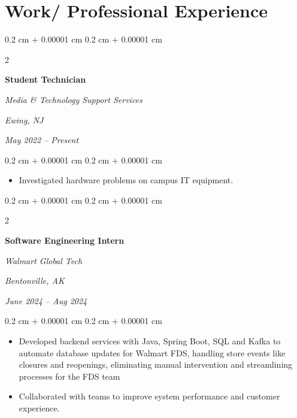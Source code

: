 \documentclass[10pt, letterpaper]{article}
\newenvironment{highlights}{
    \begin{itemize}[
        topsep=0.10 cm,
        parsep=0.10 cm,
        partopsep=0pt,
        itemsep=0pt,
        leftmargin=0.4 cm + 10pt
    ]
}{
    \end{itemize}
} %
\newenvironment{onecolentry}{
    \begin{adjustwidth}{
        0.2 cm + 0.00001 cm
    }{
        0.2 cm + 0.00001 cm
    }
}{
    \end{adjustwidth}
} %
\newenvironment{twocolentry}[2][]{
    \onecolentry
    \def\secondColumn{#2}
    \setcolumnwidth{\fill, 4.5 cm}
    \begin{paracol}{2}
}{
    \switchcolumn \raggedleft \secondColumn
    \end{paracol}
    \endonecolentry
} %
\begin{document}
    
    \section{Work/ Professional Experience}

        
        \begin{twocolentry}{
        \textit{Ewing, NJ}    
            
        \textit{May 2022 – Present}}
            \textbf{Student Technician }
            
            \textit{Media \& Technology Support Services}
        \end{twocolentry}

        \vspace{0.10 cm}
        \begin{onecolentry}
            \begin{highlights}
                \item Investigated hardware problems on campus IT equipment.
            \end{highlights}
        \end{onecolentry}


        \vspace{0.2 cm}

        \begin{twocolentry}{
        \textit{Bentonville, AK}    
            
        \textit{June 2024 – Aug 2024}}
            \textbf{Software Engineering Intern}
            
            \textit{Walmart Global Tech}
        \end{twocolentry}

        \vspace{0.10 cm}
        \begin{onecolentry}
            \begin{highlights}
                \item Developed backend services with Java, Spring Boot, SQL and Kafka to automate database updates for Walmart FDS, handling store events like closures and reopenings, eliminating manual intervention and streamlining processes for the FDS team
                \item Collaborated with teams to improve system performance and customer experience.
               
            \end{highlights}
        \end{onecolentry}
        
\end{document}
